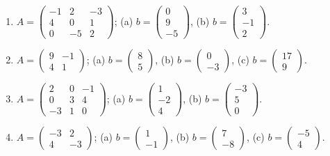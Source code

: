 \begin{enumerate}[label=\arabic*., leftmargin=*]
\item $A=\begin{pmatrix}-1&2&-3\\4&0&1\\0&-5&2\end{pmatrix}$; \quad
(a) $b=\begin{pmatrix}0\\9\\-5\end{pmatrix}$, \quad
(b) $b=\begin{pmatrix}3\\-1\\2\end{pmatrix}$.

\item $A=\begin{pmatrix}9&-1\\4&1\end{pmatrix}$; \quad
(a) $b=\begin{pmatrix}8\\5\end{pmatrix}$, \quad
(b) $b=\begin{pmatrix}0\\-3\end{pmatrix}$, \quad
(c) $b=\begin{pmatrix}17\\9\end{pmatrix}$.

\item $A=\begin{pmatrix}2&0&-1\\0&3&4\\-3&1&0\end{pmatrix}$; \quad
(a) $b=\begin{pmatrix}1\\-2\\4\end{pmatrix}$, \quad
(b) $b=\begin{pmatrix}-3\\5\\0\end{pmatrix}$.

\item $A=\begin{pmatrix}-3&2\\4&-3\end{pmatrix}$; \quad
(a) $b=\begin{pmatrix}1\\-1\end{pmatrix}$, \quad
(b) $b=\begin{pmatrix}7\\-8\end{pmatrix}$, \quad
(c) $b=\begin{pmatrix}-5\\4\end{pmatrix}$.


\end{enumerate}
